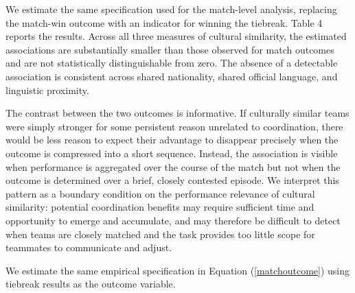 \documentclass[10pt]{article}
\begin{document}
We estimate the same specification used for the match-level analysis, replacing the match-win outcome with an indicator for winning the tiebreak. Table 4 reports the results. Across all three measures of cultural similarity, the estimated associations are substantially smaller than those observed for match outcomes and are not statistically distinguishable from zero. The absence of a detectable association is consistent across shared nationality, shared official language, and linguistic proximity.

The contrast between the two outcomes is informative. If culturally similar teams were simply stronger for some persistent reason unrelated to coordination, there would be less reason to expect their advantage to disappear precisely when the outcome is compressed into a short sequence. Instead, the association is visible when performance is aggregated over the course of the match but not when the outcome is determined over a brief, closely contested episode. We interpret this pattern as a boundary condition on the performance relevance of cultural similarity: potential coordination benefits may require sufficient time and opportunity to emerge and accumulate, and may therefore be difficult to detect when teams are closely matched and the task provides too little scope for teammates to communicate and adjust.

We estimate the same empirical specification in Equation (\ref{matchoutcome}) using tiebreak results as the outcome variable.
\end{document}
